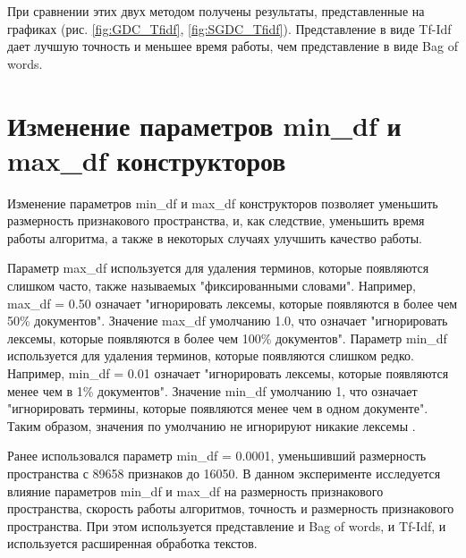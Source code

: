 \documentclass{article}
\begin{document}
При сравнении этих двух методом получены результаты, представленные на графиках (рис. \ref{fig:GDC_Tfidf}, \ref{fig:SGDC_Tfidf}). Представление в виде Tf-Idf дает лучшую точность и меньшее время работы, чем представление в виде Bag of words. 

\section{Изменение параметров min\_df и max\_df конструкторов}

Изменение параметров min\_df и max\_df конструкторов позволяет уменьшить размерность признакового пространства, и, как следствие, уменьшить время работы алгоритма, а также в некоторых случаях улучшить качество работы. 

Параметр max\_df используется для удаления терминов, которые появляются слишком часто, также называемых "фиксированными словами". Например, max\_df = 0.50 означает "игнорировать лексемы, которые появляются в более чем 50\% документов". Значение max\_df умолчанию 1.0, что означает "игнорировать лексемы, которые появляются в более чем 100\% документов". Параметр min\_df используется для удаления терминов, которые появляются слишком редко. Например, min\_df = 0.01 означает "игнорировать лексемы, которые появляются менее чем в 1\% документов". Значение min\_df умолчанию 1, что означает "игнорировать термины, которые  появляются менее чем в одном документе". Таким образом, значения по умолчанию не игнорируют никакие лексемы \cite{ss2}.

Ранее использовался параметр min\_df = 0.0001, уменьшивший размерность пространства с
89658 признаков до 16050. В данном эксперименте исследуется влияние параметров min\_df и max\_df на размерность признакового пространства, скорость работы алгоритмов, точность и размерность признакового пространства. При этом используется представление и Bag of words, и Tf-Idf, и используется расширенная обработка текстов.
\end{document}
